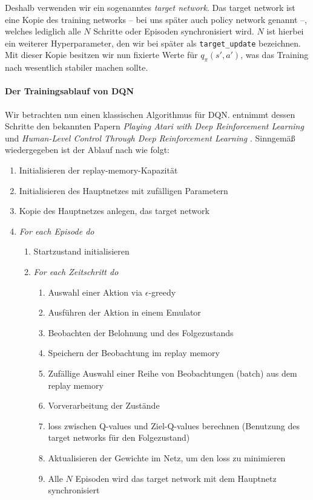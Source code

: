 Deshalb verwenden wir ein sogenanntes \textit{target network}. Das target network ist eine Kopie des training networks -- bei uns später auch policy network genannt --, welches lediglich alle $ N $ Schritte oder Episoden synchronisiert wird. $ N $ ist hierbei ein weiterer Hyperparameter, den wir bei später als \texttt{target_update} bezeichnen. Mit dieser Kopie besitzen wir nun fixierte Werte für $ q_\pi(s', a') $, was das Training nach \cite{11_maxim2018deeprl} wesentlich stabiler machen sollte.

\paragraph{Der Trainingsablauf von DQN}
Wir betrachten nun einen klassischen Algorithmus für DQN. \cite{11_maxim2018deeprl} entnimmt dessen Schritte den bekannten Papern \textit{Playing Atari with Deep Reinforcement Learning} \cite{13_mnih2013atari} und \textit{Human-Level Control Through Deep Reinforcement Learning} \cite{12_mnih2015humanlevel}. Sinngemäß wiedergegeben ist der Ablauf nach \cite{12_mnih2015humanlevel} wie folgt:
\begin{enumerate}[nosep]
    \item Initialisieren der replay-memory-Kapazität
    \item Initialisieren des Hauptnetzes mit zufälligen Parametern
    \item Kopie des Hauptnetzes anlegen, das target network
    \item \textit{For each Episode do}
    \begin{enumerate}
        \item Startzustand initialisieren
        \item \textit{For each Zeitschritt do}
        \begin{enumerate}
            \item Auswahl einer Aktion via $ \epsilon $-greedy
            \item Ausführen der Aktion in einem Emulator
            \item Beobachten der Belohnung und des Folgezustands
            \item Speichern der Beobachtung im replay memory
            \item Zufällige Auswahl einer Reihe von Beobachtungen (batch) aus dem replay memory
            \item Vorverarbeitung der Zustände
            \item loss zwischen Q-values und Ziel-Q-values berechnen (Benutzung des target networks für den Folgezustand) %
            \item Aktualisieren der Gewichte im Netz, um den loss zu minimieren
            \item Alle $ N $ Episoden wird das target network mit dem Hauptnetz synchronisiert
        \end{enumerate}
    \end{enumerate}
\end{enumerate}
